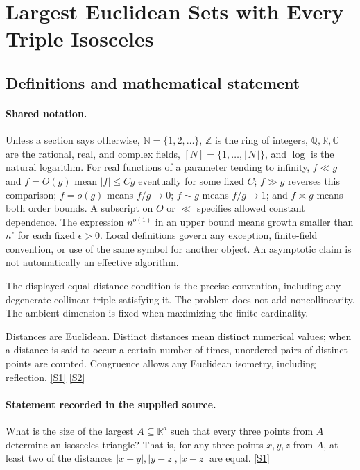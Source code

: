 \documentclass[11pt,a4paper]{article}
\newcommand{\N}{\mathbb{N}}
\newcommand{\Z}{\mathbb{Z}}
\newcommand{\Q}{\mathbb{Q}}
\newcommand{\R}{\mathbb{R}}
\newcommand{\C}{\mathbb{C}}
\newcommand{\sref}[2]{\hyperlink{source:#1:#2}{[S#2]}}
\begin{document}
\section{Largest Euclidean Sets with Every Triple Isosceles}\label{statement}


\subsection{Definitions and mathematical statement}

\paragraph{Shared notation.}Unless a section says otherwise, $\N=\{1,2,\ldots\}$,
$\Z$ is the ring of integers, $\Q,\R,\C$ are the rational, real, and complex
fields, $[N]=\{1,\ldots,\lfloor N\rfloor\}$, and $\log$ is the natural
logarithm. For real functions of a parameter tending to infinity,
$f\ll g$ and $f=O(g)$ mean $|f|\leq Cg$ eventually for some fixed $C$;
$f\gg g$ reverses this comparison; $f=o(g)$ means $f/g\to0$;
$f\sim g$ means $f/g\to1$; and $f\asymp g$ means both order bounds.
A subscript on $O$ or $\ll$ specifies allowed constant dependence.
The expression $n^{o(1)}$ in an upper bound means growth smaller than
$n^\epsilon$ for each fixed $\epsilon>0$. Local definitions govern any
exception, finite-field convention, or use of the same symbol for another
object. An asymptotic claim is not automatically an effective algorithm.



The displayed equal-distance condition is the precise convention, including any degenerate collinear triple satisfying it. The problem does not add noncollinearity. The ambient dimension is fixed when maximizing the finite cardinality.

Distances are Euclidean. Distinct distances mean distinct numerical values; when a distance is said to occur a certain number of times, unordered pairs of distinct points are counted. Congruence allows any Euclidean isometry, including reflection. \sref{statement}{1} \sref{statement}{2}

\paragraph{Statement recorded in the supplied source.}
What is the size of the largest $A\subseteq \mathbb{R}^d$ such that every three points from $A$ determine an isosceles triangle? That is, for any three points $x,y,z$ from $A$, at least two of the distances $\lvert x-y\rvert,\lvert y-z\rvert,\lvert x-z\rvert$ are equal. \sref{statement}{1}
\end{document}
